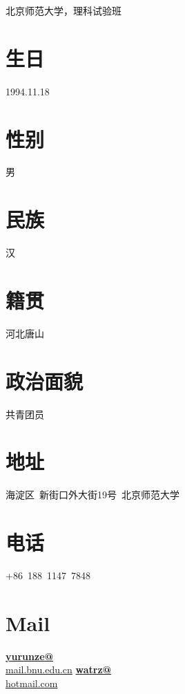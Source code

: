 \documentclass[]{friggeri-cv}
\begin{document}
      {北京师范大学，理科试验班}
      

\begin{aside}
\section{\cuti 生日}
1994.11.18
\section{\cuti 性别}
男
\section{\cuti 民族}
汉
\section{\cuti 籍贯}
河北唐山
\section{\cuti 政治面貌}
共青团员
\section{\cuti 地址}
海淀区~新街口外大街19号~北京师范大学
\section{\cuti 电话}
+86~188~1147~7848
\section{Mail}
\href{mailto:yurunze@mail.bnu.edu.cn}{\textbf{yurunze@}\\mail.bnu.edu.cn}
\href{mailto:watrz@hotmail.com}{\textbf{watrz@}\\hotmail.com}

\end{aside}
\end{document}
